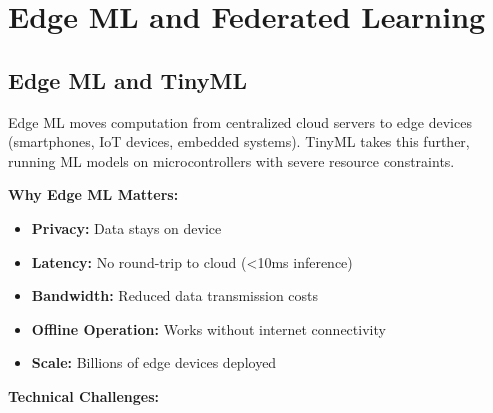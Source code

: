 \section{Edge ML and Federated Learning}

\subsection{Edge ML and TinyML}

Edge ML moves computation from centralized cloud servers to edge devices (smartphones, IoT devices, embedded systems). TinyML takes this further, running ML models on microcontrollers with severe resource constraints.

\textbf{Why Edge ML Matters:}

\begin{itemize}
    \item \textbf{Privacy:} Data stays on device
    \item \textbf{Latency:} No round-trip to cloud (<10ms inference)
    \item \textbf{Bandwidth:} Reduced data transmission costs
    \item \textbf{Offline Operation:} Works without internet connectivity
    \item \textbf{Scale:} Billions of edge devices deployed
\end{itemize}

\textbf{Technical Challenges:}

